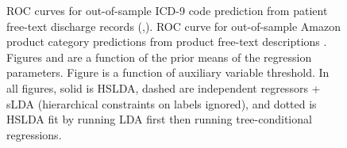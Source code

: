 \begin{figure}[h]
\begin{center}
\caption{ROC curves for out-of-sample ICD-9 code prediction from patient free-text discharge records 
(,). ROC curve for out-of-sample Amazon product category predictions from 
product free-text descriptions . Figures  and  are a function 
of the prior means of the regression parameters. Figure  is a function of auxiliary variable threshold. In all figures, solid is 
HSLDA, dashed are independent regressors + sLDA (hierarchical 
constraints on labels ignored), and dotted is HSLDA fit by running LDA first then running 
tree-conditional regressions.}
\label{fig:main_results}
\end{center}
\end{figure}

